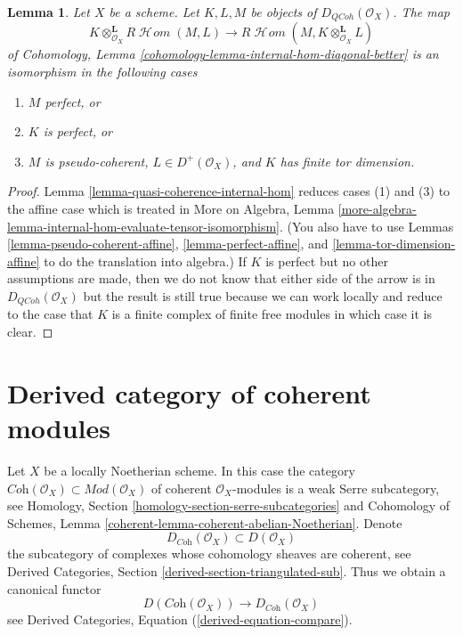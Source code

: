 \documentclass{stacks-project}
\theoremstyle{plain}
\newtheorem{lemma}[subsection]{Lemma}
\theoremstyle{definition}
\theoremstyle{remark}
\numberwithin{equation}{subsection}
\def\SheafHom{\mathop{\mathcal{H}\!\mathit{om}}\nolimits}
\def\QCoh{\mathit{QCoh}}
\begin{document}
\begin{lemma}
\label{lemma-internal-hom-evaluate-tensor-isomorphism}
Let $X$ be a scheme. Let $K, L, M$ be objects of $D_\QCoh(\mathcal{O}_X)$.
The map
$$
K \otimes_{\mathcal{O}_X}^\mathbf{L} R\SheafHom(M, L)
\longrightarrow
R\SheafHom(M, K \otimes_{\mathcal{O}_X}^\mathbf{L} L)
$$
of Cohomology, Lemma \ref{cohomology-lemma-internal-hom-diagonal-better}
is an isomorphism in the following cases
\begin{enumerate}
\item $M$ perfect, or
\item $K$ is perfect, or
\item $M$ is pseudo-coherent, $L \in D^+(\mathcal{O}_X)$, and $K$ has finite
tor dimension.
\end{enumerate}
\end{lemma}

\begin{proof}
Lemma \ref{lemma-quasi-coherence-internal-hom}
reduces cases (1) and (3) to the affine case which is treated in
More on Algebra, Lemma
\ref{more-algebra-lemma-internal-hom-evaluate-tensor-isomorphism}.
(You also have to use Lemmas \ref{lemma-pseudo-coherent-affine},
\ref{lemma-perfect-affine}, and \ref{lemma-tor-dimension-affine}
to do the translation into algebra.)
If $K$ is perfect but no other assumptions are made, then we
do not know that either side of the arrow is in $D_\QCoh(\mathcal{O}_X)$
but the result is still true because we can work locally and reduce
to the case that $K$ is a finite complex of finite free modules
in which case it is clear.
\end{proof}





\section{Derived category of coherent modules}
\label{section-derived-coherent}

\noindent
Let $X$ be a locally Noetherian scheme. In this case the category
$\textit{Coh}(\mathcal{O}_X) \subset \textit{Mod}(\mathcal{O}_X)$
of coherent $\mathcal{O}_X$-modules is a weak Serre subcategory, see
Homology, Section \ref{homology-section-serre-subcategories}
and
Cohomology of Schemes, Lemma \ref{coherent-lemma-coherent-abelian-Noetherian}.
Denote
$$
D_{\textit{Coh}}(\mathcal{O}_X) \subset D(\mathcal{O}_X)
$$
the subcategory of complexes whose cohomology sheaves are coherent, see
Derived Categories, Section \ref{derived-section-triangulated-sub}.
Thus we obtain a canonical functor
\begin{equation}
\label{equation-compare-coherent}
D(\textit{Coh}(\mathcal{O}_X))
\longrightarrow
D_{\textit{Coh}}(\mathcal{O}_X)
\end{equation}
see Derived Categories, Equation (\ref{derived-equation-compare}).
\end{document}
